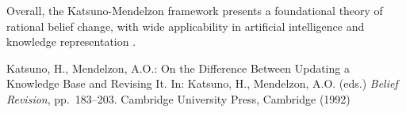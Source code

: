 \documentclass[runningheads]{llncs}
\begin{document}
Overall, the Katsuno-Mendelzon framework presents a foundational theory of rational belief change, with wide applicability in artificial intelligence and knowledge representation \cite{katsuno}.

\begin{thebibliography}{1}

Katsuno, H., Mendelzon, A.O.:
On the Difference Between Updating a Knowledge Base and Revising It.
In: Katsuno, H., Mendelzon, A.O. (eds.) \textit{Belief Revision}, pp.~183--203.
Cambridge University Press, Cambridge (1992)

\end{thebibliography}
\end{document}
